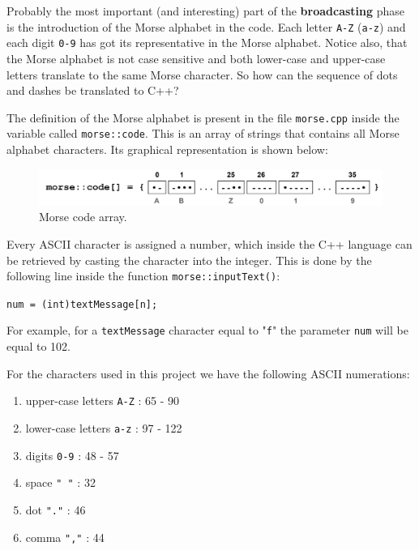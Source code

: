 \documentclass[12pt]{report}
\begin{document}
Probably the most important (and interesting) part of the \textbf{broadcasting} phase is the introduction of the Morse alphabet in the code. Each letter \verb|A-Z| (\verb|a-z|) and each digit \verb|0-9| has got its representative in the Morse alphabet. Notice also, that the Morse alphabet is not case sensitive and both lower-case and upper-case letters translate to the same Morse character. So how can the sequence of dots and dashes be translated to C++?

The definition of the Morse alphabet is present in the file \verb|morse.cpp| inside the variable called \verb|morse::code|. This is an array of strings that contains all Morse alphabet characters. Its graphical representation is shown below:

\begin{figure}[H]
\centering\includegraphics[scale=0.1]{morse--code}
\caption{Morse code array.}				
\label{fig:morse_code_array}
\end{figure}

Every ASCII character is assigned a number, which inside the C++ language can be retrieved by casting the character into the integer. This is done by the following line inside the function \verb|morse::inputText()|: 

\begin{snugshade}
\verb|num = (int)textMessage[n];|
\end{snugshade}

For example, for a \verb|textMessage| character equal to "\verb|f|" the parameter \verb|num| will be equal to 102.

For the characters used in this project we have the following ASCII numerations:


\begin{enumerate}

\item upper-case letters \verb|A-Z| : 65 - 90

\item lower-case letters \verb|a-z| : 97 - 122

\item digits \verb|0-9| : 48 - 57

\item space \verb|" "| : 32

\item dot \verb|"."| : 46

\item comma \verb|","| : 44

\end{enumerate}
\end{document}
